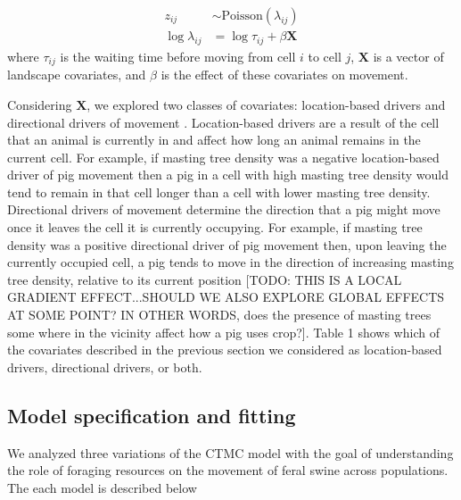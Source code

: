 \documentclass[a4paper]{article}
\begin{document}
\begin{align}
  z_{ij} &\sim \text{Poisson}(\lambda_{ij}) \\
  \log \lambda_{ij} &= \log{\tau_{ij}} + \beta \mathbf{X}
\end{align}
where $\tau_{ij}$ is the waiting time before moving from cell $i$ to cell $j$, $\mathbf{X}$ is a vector of landscape covariates, and $\beta$ is the effect of these covariates on movement.  

Considering $\mathbf{X}$, we explored two classes of covariates: location-based drivers and directional drivers of movement \citep{Hanks2015}.  Location-based drivers are a result of the cell that an animal is currently in and affect how long an animal remains in the current cell.  For example, if masting tree density was a negative location-based driver of pig movement then a pig in a cell with high masting tree density would tend to remain in that cell longer than a cell with lower masting tree density. Directional drivers of movement determine the direction that a pig might move once it leaves the cell it is currently occupying.  For example, if masting tree density was a positive directional driver of pig movement then, upon leaving the currently occupied cell, a pig tends to move in the direction of increasing masting tree density, relative to its current position [TODO: THIS IS A LOCAL GRADIENT EFFECT...SHOULD WE ALSO EXPLORE GLOBAL EFFECTS AT SOME POINT? IN OTHER WORDS, does the presence of masting trees some where in the vicinity affect how a pig uses crop?]. Table 1 shows which of the covariates described in the previous section we considered as location-based drivers, directional drivers, or both.  

\subsection*{Model specification and fitting}

We analyzed three variations of the CTMC model with the goal of understanding the role of foraging resources on the movement of feral swine across populations.  The each model is described below

\end{document}

